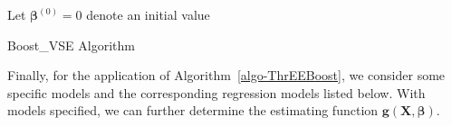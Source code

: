 \begin{algorithm}[H]
 Let $\boldsymbol{\beta}^{(0)}=0$ denote an initial value\;
 \caption{Boost\_VSE Algorithm} \label{algo-ThrEEBoost}
\end{algorithm}


Finally, for the application of Algorithm~\ref{algo-ThrEEBoost}, we consider some specific {models} and the corresponding regression models listed below. With models specified, we can further determine the estimating function $\mathbf{g}(\mathbf{X},\boldsymbol{\beta})$.

